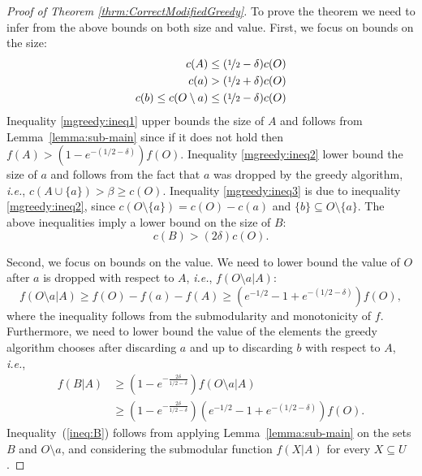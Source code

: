 \documentclass[a4paper]{article}
\begin{document}
\begin{proof}[Proof of Theorem \ref{thrm:CorrectModifiedGreedy}]
	To prove the theorem we need to infer from the above bounds on both size and value.
	First, we focus on bounds on the size:
	\begin{align}
		\label{mgreedy:ineq1}
		c(A) \leq (\nicefrac[]{1}{2} - \delta)c(O)
		\\
		\label{mgreedy:ineq2}
		c(a) > (\nicefrac[]{1}{2} + \delta)c(O)
		\\
		\label{mgreedy:ineq3}
		c(b) \leq c(O \setminus a) \leq (\nicefrac[]{1}{2} - \delta)c(O)
	\end{align}
	Inequality \eqref{mgreedy:ineq1} upper bounds the size of $A$ and follows from  Lemma~\ref{lemma:sub-main} since if it does not hold then $f(A) > (1 - e^{-(1/2 - \delta)})f(O)$.
	Inequality \eqref{mgreedy:ineq2} lower bound the size of $a$ and follows from the fact that $a$ was dropped by the greedy algorithm, {\em i.e.}, $c(A \cup \{a\}) > \beta \geq c(O)$. Inequality \eqref{mgreedy:ineq3} is due to inequality \eqref{mgreedy:ineq2}, since $c(O \setminus \{a\}) = c(O) - c(a)$ and $\{b\} \subseteq O \setminus \{a\}$.
	The above inequalities imply a lower bound  on the size of $B$:
	\begin{equation}
		\label{mgreedy:ineq4}
		c(B) > (2\delta)c(O).
	\end{equation}

	Second, we focus on bounds on the value.
	We need to lower bound the value of $O$ after $a$ is dropped with respect to $A$, {\em i.e.}, $f(O \setminus a | A)$:
	\begin{equation}
		f(O \setminus a | A) \geq f(O) - f(a) - f(A) \geq (e^{-1/2} - 1 + e^{-(1/2 - \delta)})f(O),
	\end{equation}
	where the inequality follows from the submodularity and monotonicity of $f$.
	Furthermore, we need to lower bound the value of the elements the greedy algorithm chooses after discarding $a$ and up to discarding $b$ with respect to $A$, {\em i.e.},	
	\begin{align}
		\label{ineq:B}
		f(B|A)	& \geq (1 - e^{-\frac{2\delta}{1/2 - \delta}})f(O \setminus a | A)
		\\ 		& \geq (1 - e^{-\frac{2\delta}{1/2 - \delta}})(e^{-1/2} - 1 + e^{-(1/2 - \delta)})f(O).
		\nonumber
	\end{align}	
	Inequality~(\ref{ineq:B}) follows from applying Lemma~\ref{lemma:sub-main} on the sets $B$ and $O \setminus a$, and considering the submodular function $f(X|A)$ for every $X \subseteq U$.
	

\end{proof}
\end{document}
